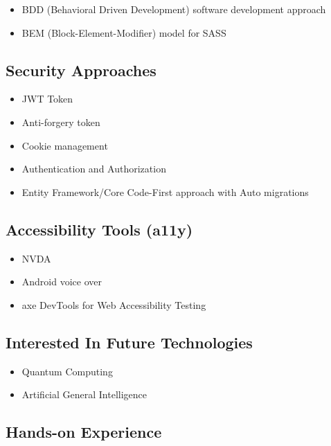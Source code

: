 \documentclass[letterpaper]{deedy-resume} %
\begin{document}
\begin{minipage}[t]{0.33\textwidth}
\begin{itemize}
\setlength\itemsep{-0.5em} %
\item BDD (Behavioral Driven Development) software development approach
\item BEM (Block-Element-Modifier) model for SASS
\end{itemize}

\subsection{Security Approaches}

\begin{itemize}
\setlength\itemsep{-0.5em} %
\item JWT Token
\item Anti-forgery token
\item Cookie management
\item Authentication and Authorization
\item Entity Framework/Core Code-First approach with Auto migrations
\end{itemize}

\subsection{Accessibility Tools (a11y)}

\begin{itemize}
\setlength\itemsep{-0.5em} %
\item NVDA
\item Android voice over
\item axe DevTools for Web Accessibility Testing
\end{itemize}

\subsection{Interested In Future Technologies}

\begin{itemize}
\setlength\itemsep{-0.5em} %
\item Quantum Computing
\item Artificial General Intelligence
\end{itemize}

\subsection{Hands-on Experience}


\end{minipage}
\end{document}
